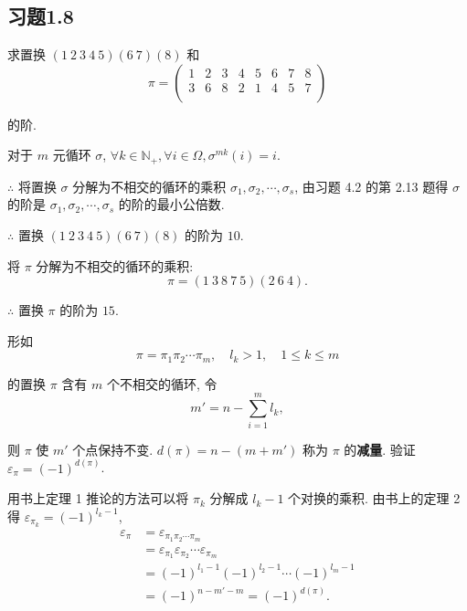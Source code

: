 \documentclass{ctexart}
\begin{document}
\subsection{习题1.8}
\addtocounter{exsection}{1}
\begin{exercise}%
    求置换 $(1\ 2\ 3\ 4\ 5)(6\ 7)(8)$ 和
    \[\pi=\begin{pmatrix}
        1 & 2 & 3 & 4 & 5 & 6 & 7 & 8 \\
        3 & 6 & 8 & 2 & 1 & 4 & 5 & 7 \\
    \end{pmatrix}\]

    的阶.
\end{exercise}
\begin{solution}
    对于 $m$ 元循环 $\sigma$, $\forall k\in\mathbb{N_+},\forall i\in\Omega,\sigma^{mk}(i)=i$.

    $\therefore$ 将置换 $\sigma$ 分解为不相交的循环的乘积 $\sigma_1,\sigma_2,\cdots,\sigma_s$, 由习题 4.2 的第 2.13 题得 $\sigma$ 的阶是 $\sigma_1,\sigma_2,\cdots,\sigma_s$ 的阶的最小公倍数.

    $\therefore$ 置换 $(1\ 2\ 3\ 4\ 5)(6\ 7)(8)$ 的阶为 $10$.

    将 $\pi$ 分解为不相交的循环的乘积:
    \[\pi=(1\ 3\ 8\ 7\ 5)(2\ 6\ 4).\]

    $\therefore$ 置换 $\pi$ 的阶为 $15$.
\end{solution}
\begin{exercise}%
    形如
    \[\pi=\pi_1\pi_2\cdots\pi_m,\quad l_k>1,\quad 1\leq k\leq m\]
    
    的置换 $\pi$ 含有 $m$ 个不相交的循环, 令
    \[m'=n-\sum\limits_{i=1}^{m}l_k,\]

    则 $\pi$ 使 $m'$ 个点保持不变. $d(\pi)=n-(m+m')$ 称为 $\pi$ 的\textbf{减量}. 验证 $\varepsilon_\pi=(-1)^{d(\pi)}$.
\end{exercise}
\begin{solution}
    用书上定理 1 推论的方法可以将 $\pi_k$ 分解成 $l_k-1$ 个对换的乘积. 由书上的定理 2 得 $\varepsilon_{\pi_k}=(-1)^{l_k-1}$,
    \begin{align*}
        \varepsilon_{\pi} & =\varepsilon_{\pi_1\pi_2\cdots\pi_m} \\
        & =\varepsilon_{\pi_1}\varepsilon_{\pi_2}\cdots\varepsilon_{\pi_m} \\
        & =(-1)^{l_1-1}(-1)^{l_2-1}\cdots(-1)^{l_m-1} \\
        & =(-1)^{n-m'-m}=(-1)^{d(\pi)}.
    \end{align*}
\end{solution}
\end{document}

